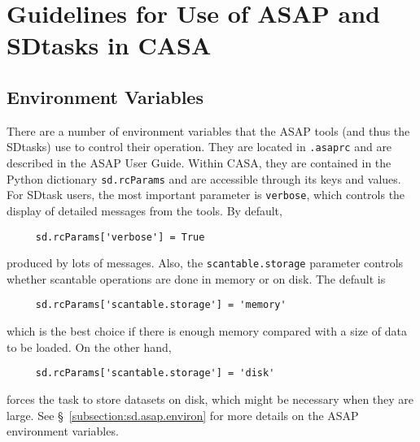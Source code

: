 

\section{Guidelines for Use of ASAP and SDtasks in CASA}
\label{section:sd.intro}

\subsection{Environment Variables}
\label{section:sd.intro.env}

There are a number of environment variables that the ASAP tools
(and thus the SDtasks) use to control their operation.
They are located in {\tt .asaprc} and are described in the ASAP User Guide.
Within CASA, they are contained in the
Python dictionary {\tt sd.rcParams} and are accessible through
its keys and values.  For SDtask users, the most important parameter is
{\tt verbose}, which controls the display of detailed
messages from the tools. By default,
\small
\begin{verbatim}
     sd.rcParams['verbose'] = True
\end{verbatim}
\normalsize
produced by lots of messages.  Also, the {\tt scantable.storage}
parameter controls whether scantable operations are done
in memory or on disk.  The default is  
\small
\begin{verbatim}
     sd.rcParams['scantable.storage'] = 'memory'  
\end{verbatim}
\normalsize
which is the best choice if there is enough memory
compared with a size of data to be loaded.  On the other hand,
\small
\begin{verbatim}
     sd.rcParams['scantable.storage'] = 'disk'
\end{verbatim}
\normalsize
forces the task to store datasets on disk, which might be necessary when they are large.
See \S~\ref{subsection:sd.asap.environ} for more details on the
ASAP environment variables.

